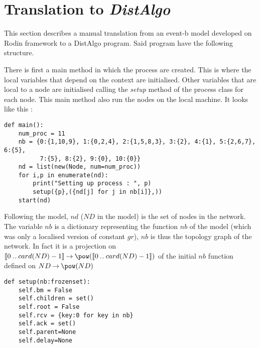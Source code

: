 \section{Translation to \textit{DistAlgo}}

This section describes a manual translation from an event-b model developed on Rodin framework to a DistAlgo program.
Said program have the following structure.

There is first a main method in which the process are created. This is where the local variables that depend on the context are initialised. Other variables that are local to a node are initialised calling the \textit{setup} method of the process class for each node.
This main method also run the nodes on the local machine.
It looks like this :
\begin{verbatim}
def main():
    num_proc = 11
    nb = {0:{1,10,9}, 1:{0,2,4}, 2:{1,5,8,3}, 3:{2}, 4:{1}, 5:{2,6,7}, 6:{5},
          7:{5}, 8:{2}, 9:{0}, 10:{0}}
    nd = list(new(Node, num=num_proc))
    for i,p in enumerate(nd):
        print("Setting up process : ", p)
        setup({p},({nd[j] for j in nb[i]},))
    start(nd)
\end{verbatim}

Following the model, $nd$ ($ND$ in the model) is the set of nodes in the network.
The variable $nb$ is a dictionary representing the function $nb$ of the model (which was only a localised version of constant $gr$), $nb$ is thus the topology graph of the network. In fact it is a projection on $\llbracket0\upto card(ND)-1\rrbracket \tfun \pow(\llbracket0\upto card(ND)-1\rrbracket)$ of the initial $nb$ function defined on $ND \tfun \pow(ND)$
 
\bigskip
{}\hfill
\begin{minipage}[c]{.4\linewidth}
\begin{verbatim}
def setup(nb:frozenset):
    self.bm = False
    self.children = set()
    self.root = False
    self.rcv = {key:0 for key in nb}
    self.ack = set()
    self.parent=None
    self.delay=None 
\end{verbatim}
\end{minipage}
\bigskip

